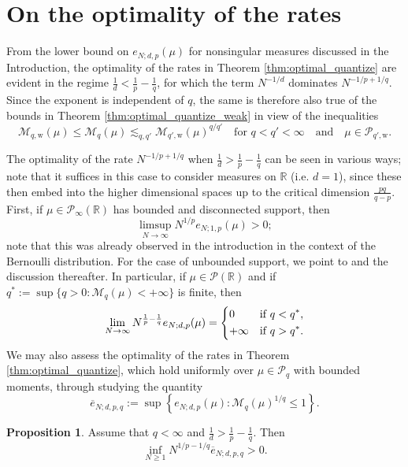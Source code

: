\documentclass[11pt,reqno]{amsart}
\theoremstyle{definition}
\newcommand{\weak}{{\mathrm{w}}}
\newcommand{\RR}{{\mathbb R}}
\newcommand{\oline}[1]{\overline{#1}}
\newcommand{\mcl}{\mathcal}
\newtheorem{proposition}{Proposition}
\theoremstyle{definition}
\numberwithin{equation}{section}
\numberwithin{lemma}{section}
\numberwithin{proposition}{section}
\numberwithin{theorem}{section}
\numberwithin{corollary}{section}
\numberwithin{definition}{section}
\numberwithin{remark}{section}
\begin{document}
\section{On the optimality of the rates}\label{sec:optimality}

From the lower bound on $e_{N;d,p}(\mu)$ for nonsingular measures discussed in the Introduction, the optimality of the rates in Theorem \ref{thm:optimal_quantize} are evident in the regime $\frac{1}{d} < \frac{1}{p} - \frac{1}{q}$, for which the term $N^{-1/d}$ dominates $N^{-1/p + 1/q}$. Since the exponent is independent of $q$, the same is therefore also true of the bounds in Theorem \ref{thm:optimal_quantize_weak} in view of the inequalities
\[
    \mcl M_{q,\weak}(\mu) \le \mcl M_q(\mu) \lesssim_{q,q'} \mcl M_{q',\weak}(\mu)^{q/q'} \quad \text{for } q < q' < \infty \quad \text{and} \quad \mu \in \mcl P_{q', \weak}.
\]


The optimality of the rate $N^{-1/p + 1/q}$ when $\frac{1}{d} > \frac{1}{p} - \frac{1}{q}$ can be seen in various ways; note that it suffices in this case to consider measures on $\RR$ (i.e. $d = 1$), since these then embed into the higher dimensional spaces up to the critical dimension $\frac{pq}{q-p}$. First, if $\mu \in \mcl P_\infty(\RR)$ has bounded and disconnected support, then \cite[Remark 5.22]{BX}
\[
	\limsup_{N \to \infty} N^{1/p} e_{N;1,p}(\mu) > 0;
\]
note that this was already observed in the introduction in the context of the Bernoulli distribution. For the case of unbounded support, we point to \cite[Theorem 2.2]{BJ} and the discussion thereafter. In particular, if $\mu \in \mcl P(\RR)$ and if $q^* := \sup\{ q > 0 : \mcl M_q(\mu) < +\infty \}$ is finite, then
\[
	\lim_{N \to \infty} N^{\frac{1}{p} - \frac{1}{q} } e_{N;d,p}(\mu) = 
	\begin{dcases}
		0 & \text{if } q < q^*, \\
		+\infty & \text{if } q > q^*.
	\end{dcases}
\]
We may also assess the optimality of the rates in Theorem \ref{thm:optimal_quantize}, which hold uniformly over $\mu \in \mcl P_q$ with bounded moments, through studying the quantity
\begin{equation}\label{ebar}
	\oline e_{N;d,p,q} :=  \sup\left\{ e_{N;d,p}(\mu) : \mcl M_q(\mu)^{1/q} \le 1 \right\}.
\end{equation}

\begin{proposition}\label{prop:uniform_optimal}
	Assume that $q < \infty$ and $\frac{1}{d} > \frac{1}{p} - \frac{1}{q}$. Then
	\[
		\inf_{N \ge 1} N^{1/p - 1/q}\oline e_{N;d,p,q} > 0.
	\]
\end{proposition}
\end{document}

